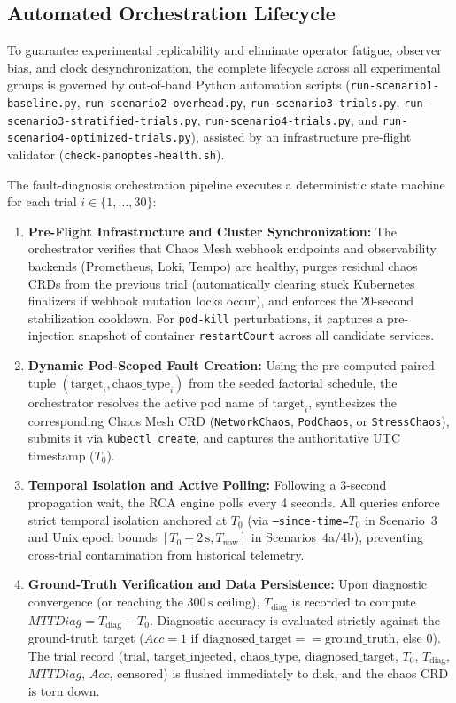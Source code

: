 \subsection{Automated Orchestration Lifecycle}
\label{subsec:automated-orchestration-lifecycle}

To guarantee experimental replicability and eliminate operator fatigue, observer bias, and clock desynchronization, the complete lifecycle across all experimental groups is governed by out-of-band Python automation scripts (\texttt{run-scenario1-baseline.py}, \texttt{run-scenario2-overhead.py}, \texttt{run-scenario3-trials.py}, \texttt{run-scenario3-stratified-trials.py}, \texttt{run-scenario4-trials.py}, and \texttt{run-scenario4-optimized-trials.py}), assisted by an infrastructure pre-flight validator (\texttt{check-panoptes-health.sh}).

The fault-diagnosis orchestration pipeline executes a deterministic state machine for each trial $i \in \{1, \dots, 30\}$:
\begin{enumerate}
    \item \textbf{Pre-Flight Infrastructure and Cluster Synchronization:} The orchestrator verifies that Chaos Mesh webhook endpoints and observability backends (Prometheus, Loki, Tempo) are healthy, purges residual chaos CRDs from the previous trial (automatically clearing stuck Kubernetes finalizers if webhook mutation locks occur), and enforces the 20-second stabilization cooldown. For \texttt{pod-kill} perturbations, it captures a pre-injection snapshot of container \texttt{restartCount} across all candidate services.
    
    \item \textbf{Dynamic Pod-Scoped Fault Creation:} Using the pre-computed paired tuple $(\text{target}_i, \text{chaos\_type}_i)$ from the seeded factorial schedule, the orchestrator resolves the active pod name of $\text{target}_i$, synthesizes the corresponding Chaos Mesh CRD (\texttt{NetworkChaos}, \texttt{PodChaos}, or \texttt{StressChaos}), submits it via \texttt{kubectl create}, and captures the authoritative UTC timestamp ($T_0$).
    
    \item \textbf{Temporal Isolation and Active Polling:} Following a 3-second propagation wait, the RCA engine polls every 4 seconds. All queries enforce strict temporal isolation anchored at $T_0$ (via \texttt{--since-time=}$T_0$ in Scenario~3 and Unix epoch bounds $[T_0 - 2\,\text{s}, T_{\text{now}}]$ in Scenarios~4a/4b), preventing cross-trial contamination from historical telemetry.

    \item \textbf{Ground-Truth Verification and Data Persistence:} Upon diagnostic convergence (or reaching the $300\,\text{s}$ ceiling), $T_{\text{diag}}$ is recorded to compute $MTTDiag = T_{\text{diag}} - T_0$. Diagnostic accuracy is evaluated strictly against the ground-truth target ($Acc = 1$ if $\text{diagnosed\_target} == \text{ground\_truth}$, else $0$). The trial record ($\text{trial}$, $\text{target\_injected}$, $\text{chaos\_type}$, $\text{diagnosed\_target}$, $T_0$, $T_{\text{diag}}$, $MTTDiag$, $Acc$, $\text{censored}$) is flushed immediately to disk, and the chaos CRD is torn down.
\end{enumerate}

